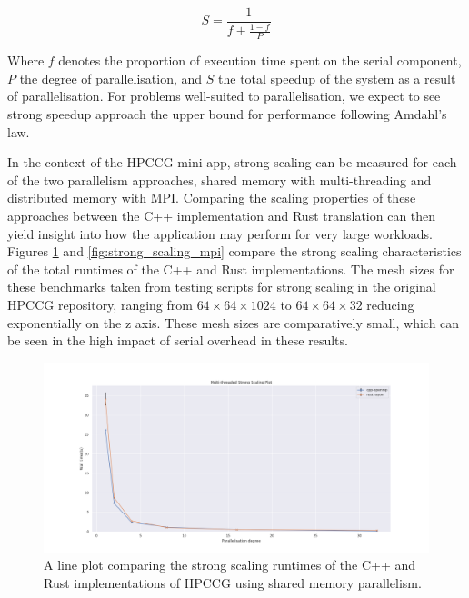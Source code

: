 \begin{equation}
    S = \frac{1}{f + \frac{1-f}{P}}
\end{equation}

Where $f$ denotes the proportion of execution time spent on the serial component, $P$ the degree of parallelisation, and $S$ the total speedup of the system as a result of parallelisation. For problems well-suited to parallelisation, we expect to see strong speedup approach the upper bound for performance following Amdahl's law.

In the context of the HPCCG mini-app, strong scaling can be measured for each of the two parallelism approaches, shared memory with multi-threading and distributed memory with MPI. Comparing the scaling properties of these approaches between the C++ implementation and Rust translation can then yield insight into how the application may perform for very large workloads. Figures \ref{fig:strong_scaling_threaded} and \ref{fig:strong_scaling_mpi} compare the strong scaling characteristics of the total runtimes of the C++ and Rust implementations. The mesh sizes for these benchmarks taken from testing scripts for strong scaling in the original HPCCG repository, ranging from $64 \times 64 \times 1024$ to $64 \times 64 \times 32$ reducing exponentially on the z axis. These mesh sizes are comparatively small, which can be seen in the high impact of serial overhead in these results.

\begin{figure}[H]
    \centering
    \includegraphics[width=\textwidth]{images/5_performance/scaling/strong_scaling_threaded.png}
    \caption{A line plot comparing the strong scaling runtimes of the C++ and Rust implementations of HPCCG using shared memory parallelism.}
    \label{fig:strong_scaling_threaded}
\end{figure}

